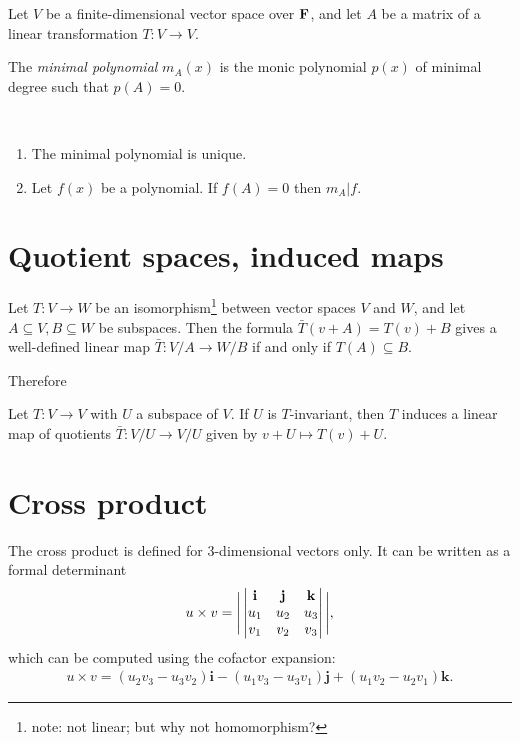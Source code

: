 \begin{lemma}
{\begin{definition*}
  Let $V$ be a finite-dimensional vector space over $\mathbf{F}$, and let $A$ be a matrix of a linear
  transformation $T:V \to V$.

  The \emph{minimal polynomial} $m_A(x)$ is the monic polynomial $p(x)$ of minimal degree such that
  $p(A) = 0$.
\end{definition*}

\begin{theorem*}
  ~\\
  \begin{enumerate}
  \item The minimal polynomial is unique.
  \item Let $f(x)$ be a polynomial. If $f(A) = 0$ then $m_A | f$.
  \end{enumerate}
\end{theorem*}


\section{Quotient spaces, induced maps}

\begin{theorem*}
  Let $T:V \to W$ be an isomorphism\footnote{note: not linear; but why not homomorphism?} between
  vector spaces $V$ and $W$, and let $A \subseteq V, B \subseteq W$ be subspaces. Then the formula
  $\bar T(v + A) = T(v) + B$ gives a well-defined linear map $\bar T:V/A \to W/B$ if and only if
  $T(A) \subseteq B$.
\end{theorem*}

Therefore

\begin{theorem*}
  Let $T:V \to V$ with $U$ a subspace of $V$. If $U$ is $T$-invariant, then $T$ induces a linear
  map of quotients $\bar T:V/U \to V/U$ given by $v + U \mapsto T(v) + U$.
\end{theorem*}
\section{Cross product}
\begin{definition*}
  The cross product is defined for 3-dimensional vectors only. It can be written as a formal
  determinant
  \begin{align*}
    u \times v = \Bigg|
    \begin{vmatrix}\mathbf{i} & \mathbf{j} & \mathbf{k}\\u_1 & u_2 & u_3\\v_1 & v_2 & v_3\\ \end{vmatrix}
    \Bigg|,
  \end{align*}
  which can be computed using the cofactor expansion:
  \begin{align*}
    u \times v =
      (u_2v_3 - u_3v_2)\mathbf{i}
    - (u_1v_3 - u_3v_1)\mathbf{j}
    + (u_1v_2 - u_2v_1)\mathbf{k}.
  \end{align*}
\end{definition*}


}
\end{lemma}
